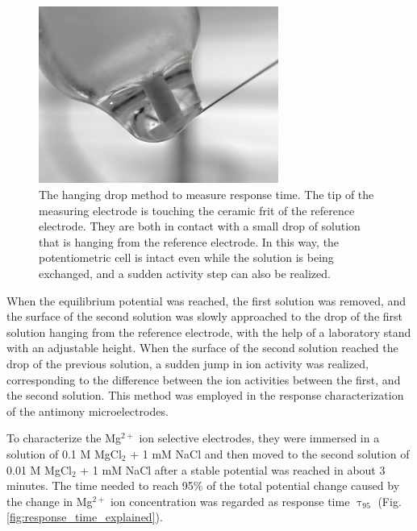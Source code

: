 \begin{figure}
\centering
\includegraphics[width=0.7\textwidth]{img/hanging.jpg}
\caption[The hanging drop method]{The hanging drop method to measure response time.
The tip of the measuring electrode is touching the ceramic frit of the reference electrode. They are both in contact with a small drop of solution that is hanging from the reference electrode. In this way, the potentiometric cell is intact even while the solution is being exchanged, and a sudden activity step can also be realized.} 
\label{fig:hanging}
\end{figure}

When the equilibrium potential was reached, the first solution was removed, and the surface of the second solution was slowly approached to the drop of the first solution hanging from the reference electrode, with the help of a laboratory stand with an adjustable height. When the surface of the second solution reached the drop of the previous solution, a sudden jump in ion activity was realized, corresponding to the difference between the ion activities between the first, and the second solution. This method was employed in the response characterization of the antimony microelectrodes.

To characterize the Mg$^{2+}$ ion selective electrodes, they were immersed in a solution of 0.1 M MgCl$_2$ + 1 mM NaCl and then moved to the second solution of 0.01 M MgCl$_2$ + 1 mM NaCl after a stable potential was reached in about 3 minutes.
The time needed to reach 95\% of the total potential change caused by the change in Mg$^{2+}$ ion concentration was regarded as response time $\uptau_{95}$ (Fig. \ref{fig:response_time_explained}).

